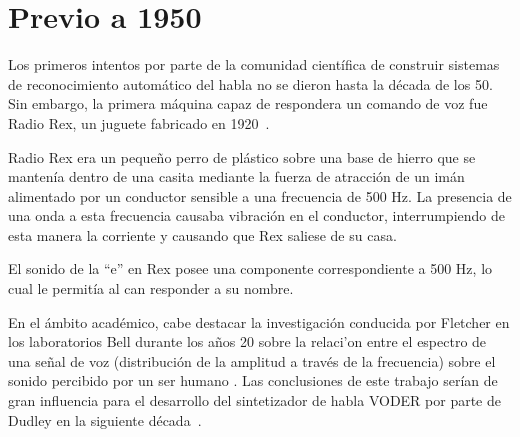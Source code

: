 \section{Previo a 1950}
\label{sec:pre50s}

Los primeros intentos por parte de la comunidad cient\'{i}fica de construir sistemas de 
reconocimiento autom\'{a}tico del habla no se dieron hasta la d\'{e}cada de los 50. 
Sin embargo, la primera m\'{a}quina capaz de respondera un comando de voz fue Radio Rex, 
un juguete fabricado en \mbox{1920 \cite{AnusuyaSpeech2009}}.

Radio Rex era un peque\~{n}o perro de pl\'{a}stico sobre una base de hierro que se manten\'{i}a dentro de una casita
mediante la fuerza de atracci\'{o}n de un im\'{a}n alimentado por un conductor sensible a una frecuencia de 500 Hz.
La presencia de una onda a esta frecuencia causaba vibraci\'{o}n en el conductor, interrumpiendo de
esta manera la corriente y causando que Rex saliese de su casa. 

El sonido de la ``e'' en Rex posee una componente correspondiente a 500 Hz, lo cual le permit\'{i}a al can responder a su nombre.

En el \'{a}mbito acad\'{e}mico, cabe destacar la investigaci\'{o}n conducida por Fletcher en los laboratorios Bell
durante los a\~{n}os 20 sobre la relaci'{o}n entre el espectro de una se\~{n}al de voz (distribuci\'{o}n de 
la amplitud a trav\'{e}s de la frecuencia) sobre el sonido percibido por un ser humano \cite{FletcherNature1922}. 
Las conclusiones de este trabajo ser\'{i}an de gran influencia para el desarrollo del sintetizador de habla VODER por parte de Dudley en la siguiente \mbox{d\'{e}cada \cite{JuangAutomaticSpeech}}. 
